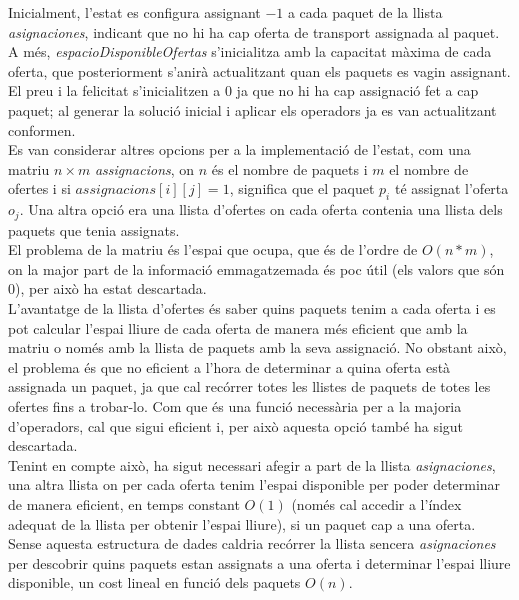 \documentclass[a4paper]{article}
\begin{document}
	Inicialment, l'estat es configura assignant $-1$ a cada paquet de la llista \emph{asignaciones}, indicant que no hi ha cap oferta de transport assignada al paquet. A més, \emph{espacioDisponibleOfertas} s'inicialitza amb la capacitat màxima de cada oferta, que posteriorment s'anirà actualitzant quan els paquets es vagin assignant. El preu i la felicitat s'inicialitzen a $0$ ja que no hi ha cap assignació fet a cap paquet; al generar la solució inicial i aplicar els operadors ja es van actualitzant conformen. \\
	
	Es van considerar altres opcions per a la implementació de l'estat, com una matriu $n \times m$ \textit{assignacions}, on $n$ és el nombre de paquets i $m$ el nombre de ofertes i si $assignacions[i][j] = 1$, significa que el paquet $p_i$ té assignat l'oferta $o_j$. Una altra opció era una llista d'ofertes on cada oferta contenia una llista dels paquets que tenia assignats. \\
	
	El problema de la matriu és l'espai que ocupa, que és de l'ordre de $O(n*m)$, on la major part de la informació emmagatzemada és poc útil (els valors que són 0), per això ha estat descartada. \\
	
	L'avantatge de la llista d'ofertes és saber quins paquets tenim a cada oferta i es pot calcular l'espai lliure de cada oferta de manera més eficient que amb la matriu o només amb la llista de paquets amb la seva assignació. No obstant això, el problema és que no eficient a l'hora de determinar a quina oferta està assignada un paquet, ja que cal recórrer totes les llistes de paquets de totes les ofertes fins a trobar-lo. Com que és una funció necessària per a la majoria d'operadors, cal que sigui eficient i, per això aquesta opció també ha sigut descartada. \\
	
	Tenint en compte això, ha sigut necessari afegir a part de la llista \textit{asignaciones}, una altra llista on per cada oferta tenim l'espai disponible per poder determinar de manera eficient, en temps constant $O(1)$ (només cal accedir a l'índex adequat de la llista per obtenir l'espai lliure), si un paquet cap a una oferta. Sense aquesta estructura de dades caldria recórrer la llista sencera \textit{asignaciones} per descobrir quins paquets estan assignats a una oferta i determinar l'espai lliure disponible, un cost lineal en funció dels paquets $O(n)$. \\
	
\end{document}
